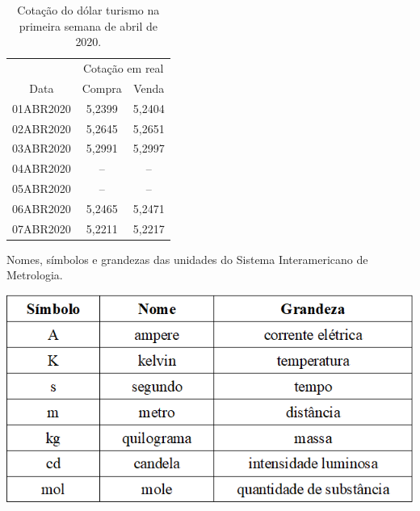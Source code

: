 \begin{enumerate}[label=\alph*)]
\begin{table}[h]
\centering
\caption{Cotação do dólar turismo na primeira semana de abril de 2020.}
\label{tab:my-table}
\begin{adjustbox}{width=0.4\textwidth,center}
\begin{tabular}{@{}ccc@{}}
\toprule
          & \multicolumn{2}{c}{Cotação em real} \\ \cmidrule(l){2-3} 
Data      & Compra           & Venda            \\
01ABR2020 & 5,2399           & 5,2404           \\
02ABR2020 & 5,2645           & 5,2651           \\
03ABR2020 & 5,2991           & 5,2997           \\
04ABR2020 & --               & --               \\
05ABR2020 & --               & --               \\
06ABR2020 & 5,2465           & 5,2471           \\
07ABR2020 & 5,2211           & 5,2217           \\ \bottomrule
\end{tabular}
\end{adjustbox}
\end{table}

    \begin{quadro}[h!]
        \caption{Nomes, símbolos e grandezas das unidades do Sistema Interamericano de Metrologia.}
        \centering
		\includegraphics{imagens/Quadro grandezas.png}
	    \label{qd:grandezas}
    \end{quadro}
    
    

\end{enumerate}
